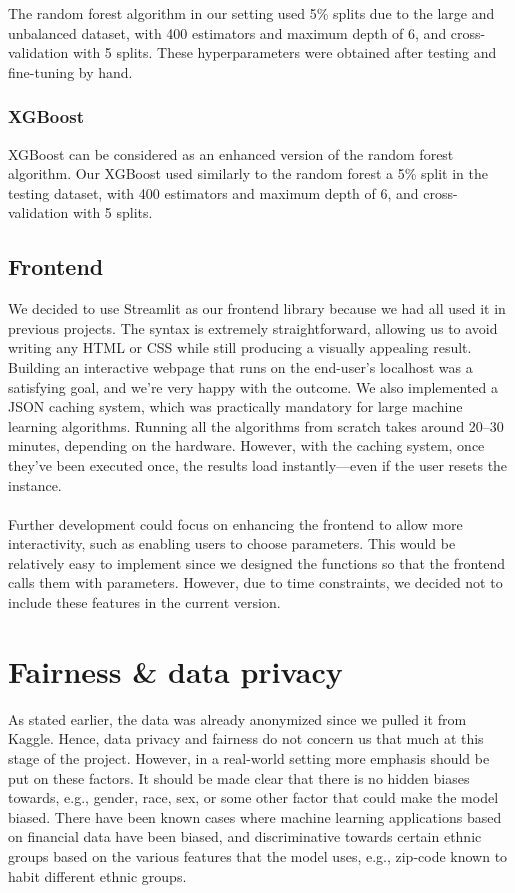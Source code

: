 \documentclass{article}
\begin{document}
The random forest algorithm in our setting used 5\% splits due to the large and unbalanced dataset, with 400 estimators and maximum depth of 6, and cross-validation with 5 splits. These hyperparameters were obtained after testing and fine-tuning by hand.

\subsubsection{XGBoost}

XGBoost can be considered as an enhanced version of the random forest algorithm. Our XGBoost used similarly to the random forest a 5\% split in the testing dataset, with 400 estimators and maximum depth of 6, and cross-validation with 5 splits.

\subsection{Frontend}
We decided to use Streamlit as our frontend library because we had all used it in previous projects. The syntax is extremely straightforward, allowing us to avoid writing any HTML or CSS while still producing a visually appealing result. Building an interactive webpage that runs on the end-user’s localhost was a satisfying goal, and we’re very happy with the outcome.
We also implemented a JSON caching system, which was practically mandatory for large machine learning algorithms. Running all the algorithms from scratch takes around 20–30 minutes, depending on the hardware. However, with the caching system, once they’ve been executed once, the results load instantly—even if the user resets the instance.\\
\\
Further development could focus on enhancing the frontend to allow more interactivity, such as enabling users to choose parameters. This would be relatively easy to implement since we designed the functions so that the frontend calls them with parameters. However, due to time constraints, we decided not to include these features in the current version.

\section{Fairness \& data privacy}

As stated earlier, the data was already anonymized since we pulled it from Kaggle. Hence, data privacy and fairness do not concern us that much at this stage of the project. However, in a real-world setting more emphasis should be put on these factors. It should be made clear that there is no hidden biases towards, e.g., gender, race, sex, or some other factor that could make the model biased. There have been known cases where machine learning applications based on financial data have been biased, and discriminative towards certain ethnic groups based on the various features that the model uses, e.g., zip-code known to habit different ethnic groups.
\end{document}
